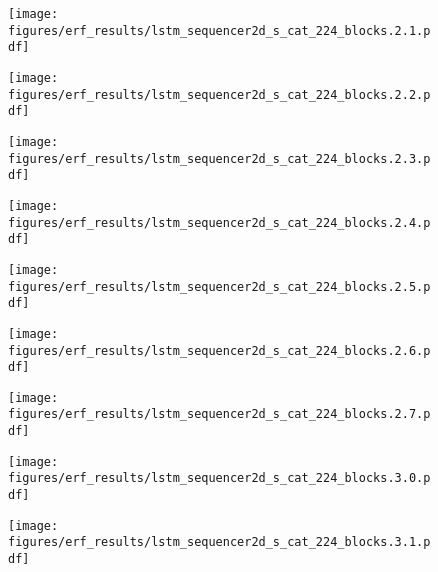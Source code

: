 \documentclass{article}
\begin{document}
\begin{figure}[tb]
\begin{minipage}[t]{0.13\hsize}
    \centering
    \texttt{[image: figures/erf\_results/lstm\_sequencer2d\_s\_cat\_224\_blocks.2.1.pdf]}
    \label{figure:erf_sequencer:8}
  \end{minipage}
  \begin{minipage}[t]{0.13\hsize}
    \centering
    \texttt{[image: figures/erf\_results/lstm\_sequencer2d\_s\_cat\_224\_blocks.2.2.pdf]}
    \label{figure:erf_sequencer:9}
  \end{minipage}
  \begin{minipage}[t]{0.13\hsize}
    \centering
    \texttt{[image: figures/erf\_results/lstm\_sequencer2d\_s\_cat\_224\_blocks.2.3.pdf]}
    \label{figure:erf_sequencer:10}
  \end{minipage}
  \begin{minipage}[t]{0.13\hsize}
    \centering
    \texttt{[image: figures/erf\_results/lstm\_sequencer2d\_s\_cat\_224\_blocks.2.4.pdf]}
    \label{figure:erf_sequencer:11}
  \end{minipage}
  \begin{minipage}[t]{0.13\hsize}
    \centering
    \texttt{[image: figures/erf\_results/lstm\_sequencer2d\_s\_cat\_224\_blocks.2.5.pdf]}
    \label{figure:erf_sequencer:12}
  \end{minipage}
  \begin{minipage}[t]{0.13\hsize}
    \centering
    \texttt{[image: figures/erf\_results/lstm\_sequencer2d\_s\_cat\_224\_blocks.2.6.pdf]}
    \label{figure:erf_sequencer:13}
  \end{minipage}
  \begin{minipage}[t]{0.13\hsize}
    \centering
    \texttt{[image: figures/erf\_results/lstm\_sequencer2d\_s\_cat\_224\_blocks.2.7.pdf]}
    \label{figure:erf_sequencer:14}
  \end{minipage}
  \begin{minipage}[t]{0.13\hsize}
    \centering
    \texttt{[image: figures/erf\_results/lstm\_sequencer2d\_s\_cat\_224\_blocks.3.0.pdf]}
    \label{figure:erf_sequencer:15}
  \end{minipage}
  \begin{minipage}[t]{0.13\hsize}
    \centering
    \texttt{[image: figures/erf\_results/lstm\_sequencer2d\_s\_cat\_224\_blocks.3.1.pdf]}

\end{minipage}
\end{figure}
\end{document}
